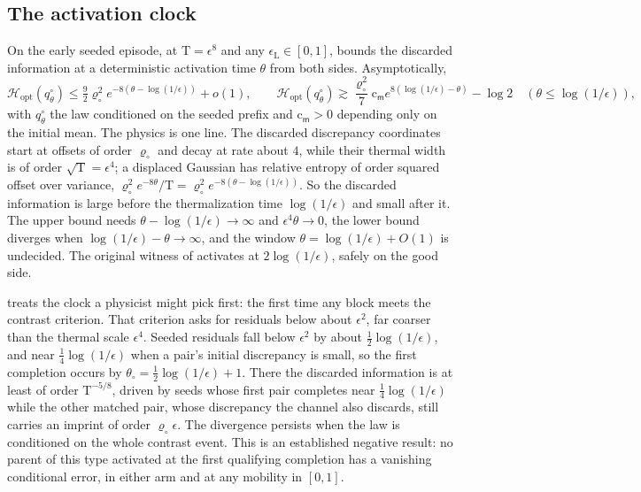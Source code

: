 \subsection{The activation clock}

On the early seeded episode, at $\mathrm T=\epsilon^8$ and any $\epsilon_{\mathrm L}\in[0,1]$,
 bounds the discarded information at a deterministic activation time
$\theta$ from both sides. Asymptotically,
\[
\mathcal H_{\mathrm{opt}}(q^\circ_\theta)\le\tfrac92\varrho_\circ^2e^{-8(\theta-\log(1/\epsilon))}+o(1),
\qquad
\mathcal H_{\mathrm{opt}}(q^\circ_\theta)\gtrsim\frac{\varrho_\circ^2}{7}\mathrm c_{\mathsf m}
e^{8(\log(1/\epsilon)-\theta)}-\log2
\quad(\theta\le\log(1/\epsilon)),
\]
with $q^\circ_\theta$ the law conditioned on the seeded prefix and $\mathrm c_{\mathsf m}>0$ depending
only on the initial mean. The physics is one line. The discarded discrepancy coordinates start at offsets
of order $\varrho_\circ$ and decay at rate about $4$, while their thermal width is of order
$\sqrt{\mathrm T}=\epsilon^4$; a displaced Gaussian has relative entropy of order squared offset over
variance, $\varrho_\circ^2e^{-8\theta}/\mathrm T=\varrho_\circ^2e^{-8(\theta-\log(1/\epsilon))}$. So the
discarded information is large before the thermalization time $\log(1/\epsilon)$ and small after it. The
upper bound needs $\theta-\log(1/\epsilon)\to\infty$ and $\epsilon^4\theta\to0$, the lower bound diverges
when $\log(1/\epsilon)-\theta\to\infty$, and the window $\theta=\log(1/\epsilon)+O(1)$ is undecided. The
original witness of  activates at $2\log(1/\epsilon)$, safely on
the good side.

 treats the clock a physicist might pick first: the first time any
block meets the contrast criterion. That criterion asks for residuals below about $\epsilon^2$, far
coarser than the thermal scale $\epsilon^4$. Seeded residuals fall below $\epsilon^2$ by about
$\tfrac12\log(1/\epsilon)$, and near $\tfrac14\log(1/\epsilon)$ when a pair's initial discrepancy is small,
so the first completion occurs by $\theta_\circ=\tfrac12\log(1/\epsilon)+1$. There the discarded
information is at least of order $\mathrm T^{-5/8}$, driven by seeds whose first pair completes near
$\tfrac14\log(1/\epsilon)$ while the other matched pair, whose discrepancy the channel also discards,
still carries an imprint of order $\varrho_\circ\epsilon$. The divergence persists when the law is
conditioned on the whole contrast event. This is an established negative result: no parent of this type
activated at the first qualifying completion has a vanishing conditional error, in either arm and at any
mobility in $[0,1]$.

